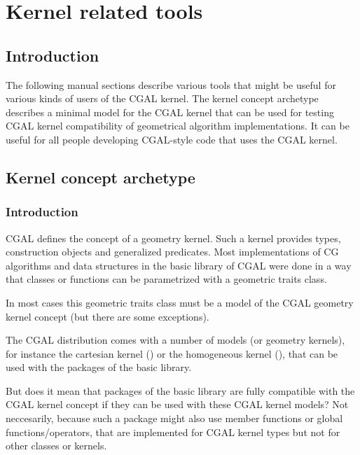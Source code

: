 \chapter{Kernel related tools}

\section{Introduction}

The following manual sections describe various tools that might be useful for
various kinds of users of the CGAL kernel. The kernel concept archetype
describes a minimal model for the CGAL kernel that can be used for testing CGAL
kernel compatibility of geometrical algorithm implementations. It can be useful
for all people developing CGAL-style code that uses the CGAL kernel.


\section{Kernel concept archetype}

\subsection{Introduction}

CGAL defines the concept of a geometry kernel. Such a kernel provides types,
construction objects and generalized predicates. Most implementations of CG
algorithms and data structures in the basic library of CGAL were done in a way
that classes or functions can be parametrized with a geometric traits class. 

In most cases this geometric traits class must be a model of the CGAL geometry
kernel concept (but there are some exceptions).

The CGAL distribution comes with a number of models (or geometry kernels), for
instance the cartesian kernel () or the homogeneous kernel
(), that can be used with the packages of the basic
library.

But does it mean that packages of the basic library are fully compatible with
the CGAL kernel concept if they can be used with these CGAL kernel models? Not
neccesarily, because such a package might also use member functions or global
functions/operators, that are implemented for CGAL kernel types but not for
other classes or kernels.

